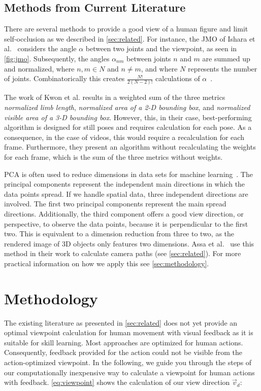 \subsection{Methods from Current Literature \label{sec:relatedMethods}}
There are several methods to provide a good view of a human figure and limit self-occlusion as we described in \autoref{sec:related}. For instance, the JMO of Ishara et al.~\cite{ishara2015mra} considers the angle \(\alpha\) between two joints and the viewpoint, as seen in \autoref{fig:jmo}. Subsequently, the angles \(\alpha_{nm}\) between joints \(n\) and \(m\) are summed up and normalized, where \(n,m \in N\) and \(n \neq m\), and where \(N\) represents the number of joints. Combinatorically this creates \(\frac{N!}{2(N-2)!}\) calculations of \(\alpha\)~\cite{charalambides2002enumerative}.

The work of Kwon et al. \cite{kwon2020ocp} results in a weighted sum of the three metrics \emph{normalized limb length}, \emph{normalized area of a 2-D bounding box}, and \emph{normalized visible area of a 3-D bounding box}. However, this, in their case, best-performing algorithm is designed for still poses and requires calculation for each pose. As a consequence, in the case of videos, this would require a recalculation for each frame. Furthermore, they present an algorithm without recalculating the weights for each frame, which is the sum of the three metrics without weights.

PCA is often used to reduce dimensions in data sets for machine learning~\cite{sorzano2014sdr}. The principal components represent the independent main directions in which the data points spread. If we handle spatial data, three independent directions are involved. The first two principal components represent the main spread directions. Additionally, the third component offers a good view direction, or perspective, to observe the data points, because it is perpendicular to the first two. This is equivalent to a dimension reduction from three to two, as the rendered image of 3D objects only features two dimensions. Assa et al.~\cite{assa2008moh} use this method in their work to calculate camera paths (see \autoref{sec:related}). For more practical information on how we apply this see \autoref{sec:methodology}.

\section{Methodology \label{sec:methodology}}
The existing literature as presented in \autoref{sec:related} does not yet provide an optimal viewpoint calculation for human movement with visual feedback as it is suitable for skill learning. Most approaches are optimized for human actions. Consequently, feedback provided for the action could not be visible from the action-optimized viewpoint. In the following, we guide you through the steps of our computationally inexpensive way to calculate a viewpoint for human actions with feedback. \autoref{eq:viewpoint} shows the calculation of our view direction $\vec{v}_d$:

